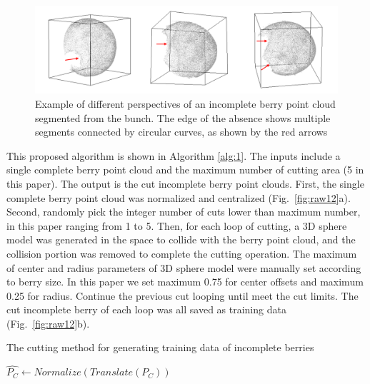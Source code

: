 \documentclass[12pt]{article}
\begin{document}
\begin{figure}[hbt!]
    \centering
    \includegraphics[width=1\textwidth]{figures/Figure8.pdf}
    \caption{Example of different perspectives of an incomplete berry point cloud segmented from the bunch. The edge of the absence shows multiple segments connected by circular curves, as shown by the red arrows}
    \label{fig:raw4}
\end{figure}

This proposed algorithm is shown in Algorithm \ref{alg:1}. 
The inputs include a single complete berry point cloud and the maximum number of cutting area (5 in this paper). 
The output is the cut incomplete berry point clouds. First, the single complete berry point cloud was normalized and centralized (Fig.~\ref{fig:raw12}a). 
Second, randomly pick the integer number of cuts lower than maximum number, in this paper ranging from 1 to 5. 
Then, for each loop of cutting, a 3D sphere model was generated in the space to collide with the berry point cloud, and the collision portion was removed to complete the cutting operation. 
The maximum of center and radius parameters of 3D sphere model were manually set according to berry size. 
In this paper we set maximum 0.75 for center offsets and maximum 0.25 for radius. 
Continue the previous cut looping until meet the cut limits. The cut incomplete berry of each loop was all saved as training data (Fig.~\ref{fig:raw12}b). 

\begin{algorithm}
    \caption{The cutting method for generating training data of incomplete berries}
    \label{alg:1}
    
    $\hat{P_C} \gets Normalize(Translate(P_C))$ 
\end{algorithm}
\end{document}
